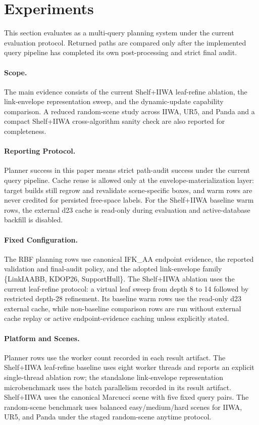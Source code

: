 \section{Experiments}\label{sec:exp}

This section evaluates \rbf{} as a multi-query planning system under the
current evaluation protocol. Returned paths are compared only after the
implemented query pipeline has completed its own post-processing and strict
final audit.

\paragraph{Scope.}
The main evidence consists of the current Shelf+IIWA leaf-refine ablation, the
link-envelope representation sweep, and the dynamic-update capability
comparison. A reduced random-scene study across IIWA, UR5, and Panda and a
compact Shelf+IIWA cross-algorithm sanity check are also reported for
completeness.

\paragraph{Reporting Protocol.}
Planner success in this paper means strict path-audit success under the current
query pipeline. Cache reuse is allowed only at the envelope-materialization
layer: target builds still regrow and revalidate scene-specific boxes, and warm
rows are never credited for persisted free-space labels. For the Shelf+IIWA
baseline warm rows, the external d23 cache is read-only during evaluation and
active-database backfill is disabled.

\paragraph{Fixed Configuration.}
The RBF planning rows use canonical IFK\_AA endpoint evidence, the reported
validation and final-audit policy, and the adopted link-envelope family
\{LinkIAABB, KDOP26, SupportHull\}. The Shelf+IIWA ablation uses the current
leaf-refine protocol: a virtual leaf sweep from depth 8 to 14 followed by
restricted depth-28 refinement. Its baseline warm rows use the read-only d23
external cache, while non-baseline comparison rows are run without external
cache replay or active endpoint-evidence caching unless explicitly stated.

\paragraph{Platform and Scenes.}
Planner rows use the worker count recorded in each result artifact. The
Shelf+IIWA leaf-refine baseline uses eight worker threads and reports an
explicit single-thread ablation row; the standalone link-envelope representation
microbenchmark uses the batch parallelism recorded in its result artifact.
Shelf+IIWA uses the canonical Marcucci scene with five fixed query pairs. The
random-scene benchmark uses balanced easy/medium/hard scenes for IIWA,
UR5, and Panda under the staged random-scene anytime protocol.

